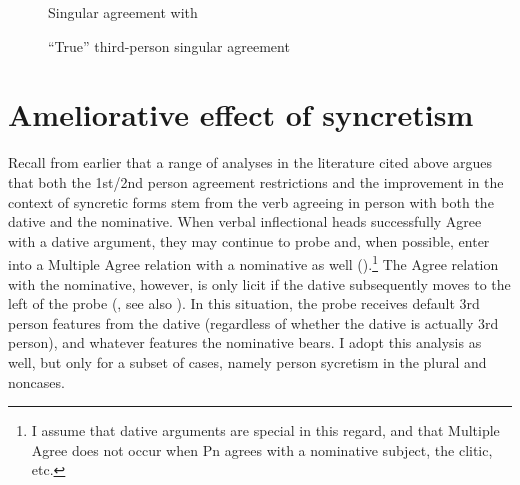 \documentclass[output=paper]{langscibook}
\begin{document}
\begin{figure}
  \begin{floatrow}
    \captionsetup{margin=.1\linewidth}
            {\caption{Singular agreement with \sti}\label{woodtree1}}
            {\caption{“True” third-person singular agreement}\label{woodtree2}}
  \end{floatrow}
\end{figure}


\section{Ameliorative effect of \sti syncretism}



Recall from earlier that a range of analyses in the literature cited above argues that both the 1st/2nd person agreement restrictions and the improvement in the context of syncretic forms stem from the verb agreeing in person with both the dative and the nominative.  When verbal inflectional heads successfully Agree with a dative argument, they may continue to probe and, when possible, enter into a Multiple Agree relation with a nominative as well (\citealt{Schutze:2003mh, SigurTHsson:2008dm, Ussery:2009jd, atlamaz2018partial, CoonKeine2020}).\footnote{I assume that dative arguments are special in this regard, and that Multiple Agree does not occur when Pn agrees with a nominative subject, the \sti clitic, etc.}  The Agree relation with the nominative, however, is only licit if the dative subsequently moves to the left of the probe (\citealt{Holmberg:2004gk, Kucerova:2007nn,kucerova2016long, SigurTHsson:2008dm}, see also \citealt{Chomsky:2008od}). In this situation, the probe receives default 3rd person features from the dative (regardless of whether the dative is actually 3rd person), and whatever features the nominative bears. I adopt this analysis as well, but only for a subset of cases, namely person sycretism in the plural and non\sti cases.
\end{document}
